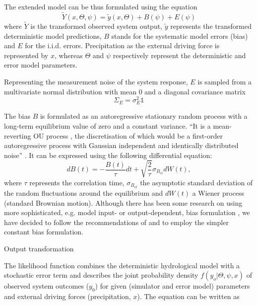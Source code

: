 \documentclass{ctuthesis}\usepackage[]{graphicx}\usepackage[]{color}
\begin{document}
The extended model can be thus formulated using the equation
\begin{equation}
\tilde{Y} (x,\Theta, \psi) = \tilde{y} (x, \Theta) + B (\psi) + E (\psi)
\end{equation}
where $\tilde{Y}$ is the transformed observed system output, $\tilde{y}$ represents the transformed deterministic model predictions, $B$ stands for the systematic model errors (bias) and $E$ for the i.i.d. errors. Precipitation as the external driving force is represented by $x$, whereas $\Theta$ and $\psi$ respectively represent the deterministic and error model parameters.



Representing the measurement noise of the system response, $E$ is sampled from a multivariate normal distribution with mean 0 and a diagonal covariance matrix
\begin{equation}
\Sigma_E= \sigma_E^2 \mathds{1}
\end{equation}


The bias $B$ is formulated as an autoregressive stationary random process with a long-term equilibrium value of zero and a constant variance. \enquote{It is a mean-reverting OU process \citep{uhlenbeck1930theory}, the discretisation of which would be a first-order autoregressive process with Gaussian independent and identically distributed noise} \citep{giudice2013improving}. It can be expressed using the following differential equation:
\begin{equation} 
dB (t)= - \frac{B (t)}{\tau}dt + \sqrt{\frac{2}{\tau}} \sigma_{B_{ct}}  dW(t),
\end{equation}
where $\tau$ represents the correlation time, $\sigma_{B_{ct}}$ the asymptotic standard deviation of the random fluctuations around the equilibrium and $dW(t)$ a Wiener process (standard Brownian motion). Although there has been some research on using more sophisticated, e.g. model input- or output-dependent, bias formulation \citep{honti2013integrated}, we have decided to follow the recommendations of \cite{giudice2013improving} and to employ the simpler constant bias formulation.

Output transformation


The likelihood function combines the deterministic hydrological model with a stochastic error term and describes the joint probability density $ f (y_{o}|\Theta, \psi, x) $ of observed system outcomes ($y_{0}$) for given (simulator and error model) parameters  and external driving forces (precipitation, $x$). The equation can be written as
\end{document}

